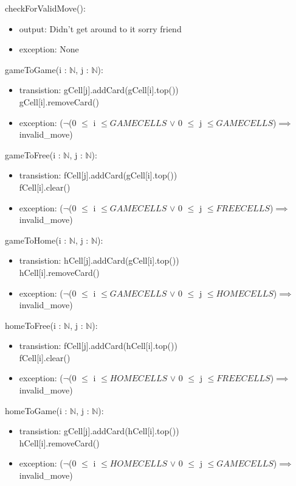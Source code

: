 \documentclass[12pt]{article}
\begin{document}
\noindent checkForValidMove():
\begin{itemize}
	\item output: Didn't get around to it sorry friend
	\item exception: None
\end{itemize}

\noindent gameToGame(i : $\mathbb{N}$, j : $\mathbb{N}$):
\begin{itemize}
	\item transistion: gCell[j].addCard(gCell[i].top())\\ gCell[i].removeCard()
	\item exception: ($\lnot$(0 $\le$ i $\le GAMECELLS$ $\lor$ 0 $\le$ j $\le GAMECELLS$)$\implies$ invalid\_move)
\end{itemize}

\noindent gameToFree(i : $\mathbb{N}$, j : $\mathbb{N}$):
\begin{itemize}
	\item transistion: fCell[j].addCard(gCell[i].top())\\ fCell[i].clear()
	\item exception: ($\lnot$(0 $\le$ i $\le GAMECELLS$ $\lor$ 0 $\le$ j $\le FREECELLS$)$\implies$ invalid\_move)
\end{itemize}

\noindent gameToHome(i : $\mathbb{N}$, j : $\mathbb{N}$):
\begin{itemize}
	\item transistion: hCell[j].addCard(gCell[i].top())\\ hCell[i].removeCard()
	\item exception: ($\lnot$(0 $\le$ i $\le GAMECELLS$ $\lor$ 0 $\le$ j $\le HOMECELLS$)$\implies$ invalid\_move)
\end{itemize}

\noindent homeToFree(i : $\mathbb{N}$, j : $\mathbb{N}$):
\begin{itemize}
	\item transistion: fCell[j].addCard(hCell[i].top())\\ fCell[i].clear()
	\item exception: ($\lnot$(0 $\le$ i $\le HOMECELLS$ $\lor$ 0 $\le$ j $\le FREECELLS$)$\implies$ invalid\_move)
\end{itemize}

\noindent homeToGame(i : $\mathbb{N}$, j : $\mathbb{N}$):
\begin{itemize}
	\item transistion: gCell[j].addCard(hCell[i].top())\\ hCell[i].removeCard()
	\item exception: ($\lnot$(0 $\le$ i $\le HOMECELLS$ $\lor$ 0 $\le$ j $\le GAMECELLS$)$\implies$ invalid\_move)
\end{itemize}
\end{document}
